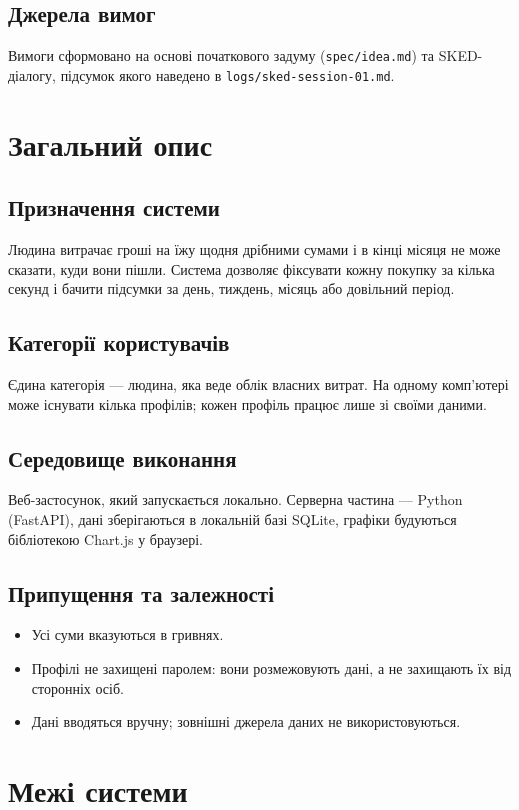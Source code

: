 \documentclass[12pt,a4paper]{article}
\begin{document}
\subsection{Джерела вимог}
Вимоги сформовано на основі початкового задуму (\texttt{spec/idea.md}) та SKED-діалогу,
підсумок якого наведено в \texttt{logs/sked-session-01.md}.

\section{Загальний опис}

\subsection{Призначення системи}
Людина витрачає гроші на їжу щодня дрібними сумами і в кінці місяця не може сказати, куди вони пішли.
Система дозволяє фіксувати кожну покупку за кілька секунд і бачити підсумки за день, тиждень, місяць
або довільний період.

\subsection{Категорії користувачів}
Єдина категорія --- людина, яка веде облік власних витрат. На одному комп'ютері може існувати
кілька профілів; кожен профіль працює лише зі своїми даними.

\subsection{Середовище виконання}
Веб-застосунок, який запускається локально. Серверна частина --- Python (FastAPI),
дані зберігаються в локальній базі SQLite, графіки будуються бібліотекою Chart.js у браузері.

\subsection{Припущення та залежності}
\begin{itemize}
  \item Усі суми вказуються в гривнях.
  \item Профілі не захищені паролем: вони розмежовують дані, а не захищають їх від сторонніх осіб.
  \item Дані вводяться вручну; зовнішні джерела даних не використовуються.
\end{itemize}

\section{Межі системи}
\end{document}
